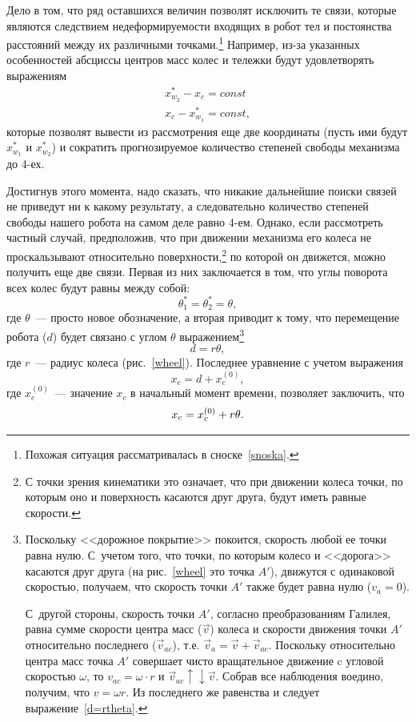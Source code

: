 \documentclass[12pt,a4paper,openany]{extarticle}
\begin{document}
Дело в том, что ряд оставшихся величин позволят исключить те связи, которые являются следствием недеформируемости входящих в робот тел и постоянства расстояний между их различными точками\lefteqn.\footnote{Похожая ситуация рассматривалась в сноске~\ref{snoska}.}
Например, из-за указанных особенностей абсциссы центров масс колес и тележки будут удовлетворять выражениям
\begin{gather}
	x_{w_2}^* - x_c = const\label{in_constant1}\\
	x_c - x_{w_1}^* = const\label{in_constant2},
\end{gather}
которые позволят вывести из рассмотрения еще две координаты (пусть ими будут $x_{w_1}^*$ и $x_{w_2}^*$) и сократить прогнозируемое количество степеней свободы механизма до 4-ех.

Достигнув этого момента, надо сказать, что никакие дальнейшие поиски связей не приведут ни к какому результату, а следовательно количество степеней свободы нашего робота на самом деле равно 4-ем.
Однако, если рассмотреть частный случай, предположив, что при движении механизма его колеса не проскальзывают относительно поверхности\lefteqn,\footnote{С точки зрения кинематики это означает, что при движении колеса точки, по которым оно и поверхность касаются друг друга, будут иметь равные скорости.} по которой он движется, можно получить еще две связи.
Первая из них заключается в том, что углы поворота всех колес будут равны между собой:
\begin{equation}
	\theta_1^* = \theta_2^* = \theta, 
\end{equation}
где $\theta$~--- просто новое обозначение, а вторая приводит к тому, что перемещение робота ($d$) будет связано с углом $\theta$ выражением\footnote{Поскольку <<дорожное покрытие>> покоится, скорость любой ее точки равна нулю. 
С~учетом того, что точки, по которым колесо и <<дорога>> касаются друг друга (на рис.~\ref{wheel} это точка $A'$), движутся с одинаковой скоростью, получаем, что скорость точки $A'$ также будет равна нулю ($v_a=0$).

С~другой стороны, скорость точки $A'$, согласно преобразованиям Галилея, равна сумме скорости центра масс ($\vec v$) колеса и скорости движения точки $A'$ относительно последнего ($\vec v_{ac}$), т.е. $\vec v_a=\vec v+\vec v_{ac}$. Поскольку относительно центра масс точка $A'$ совершает чисто вращательное движение c угловой скоростью $\omega$, то $v_{ac}=\omega\cdot r$ и $\vec v_{ac}\uparrow\downarrow\vec v$. Собрав все наблюдения воедино, получим, что $v = \omega r$. Из последнего же равенства и следует выражение~\eqref{d=rtheta}.} 
\begin{equation}\label{d=rtheta}
	d = r\theta,
\end{equation}
где $r$~--- радиус колеса (рис.~\ref{wheel}). 
Последнее уравнение с учетом выражения 
\begin{equation}
	x_c = d + x_c^{(0)}\!,
\end{equation}
где $x_c^{(0)}$~--- значение $x_c$ в начальный момент времени, позволяет заключить, что
\begin{equation}\label{xc}
	x_c = x_c^{(0)} + r\theta\ldotp
\end{equation}
\end{document}
